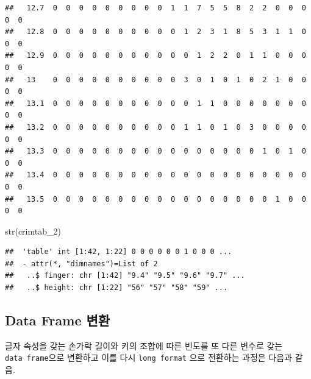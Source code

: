 \documentclass[
]{article}
\newenvironment{Shaded}{\begin{snugshade}}{\end{snugshade}}
\newcommand{\FunctionTok}[1]{\textcolor[rgb]{0.00,0.00,0.00}{#1}}
\newcommand{\NormalTok}[1]{#1}
\begin{document}
\begin{verbatim}
##   12.7  0  0  0  0  0  0  0  0  0  1  1  7  5  5  8  2  2  0  0  0  0  0
##   12.8  0  0  0  0  0  0  0  0  0  0  1  2  3  1  8  5  3  1  1  0  0  0
##   12.9  0  0  0  0  0  0  0  0  0  0  0  1  2  2  0  1  1  0  0  0  0  0
##   13    0  0  0  0  0  0  0  0  0  0  3  0  1  0  1  0  2  1  0  0  0  0
##   13.1  0  0  0  0  0  0  0  0  0  0  0  1  1  0  0  0  0  0  0  0  0  0
##   13.2  0  0  0  0  0  0  0  0  0  0  1  1  0  1  0  3  0  0  0  0  0  0
##   13.3  0  0  0  0  0  0  0  0  0  0  0  0  0  0  0  0  1  0  1  0  0  0
##   13.4  0  0  0  0  0  0  0  0  0  0  0  0  0  0  0  0  0  0  0  0  0  0
##   13.5  0  0  0  0  0  0  0  0  0  0  0  0  0  0  0  0  0  1  0  0  0  0
\end{verbatim}

\begin{Shaded}
\begin{Highlighting}[]
\FunctionTok{str}\NormalTok{(crimtab\_2)}
\end{Highlighting}
\end{Shaded}

\begin{verbatim}
##  'table' int [1:42, 1:22] 0 0 0 0 0 0 1 0 0 0 ...
##  - attr(*, "dimnames")=List of 2
##   ..$ finger: chr [1:42] "9.4" "9.5" "9.6" "9.7" ...
##   ..$ height: chr [1:22] "56" "57" "58" "59" ...
\end{verbatim}

\hypertarget{data-frame-uxbcc0uxd658}{%
\subsection{Data Frame 변환}\label{data-frame-uxbcc0uxd658}}

글자 속성을 갖는 손가락 길이와 키의 조합에 따른 빈도를 또 다른 변수로
갖는 \texttt{data\ frame}으로 변환하고 이를 다시 \texttt{long\ format}
으로 전환하는 과정은 다음과 같음.
\end{document}
